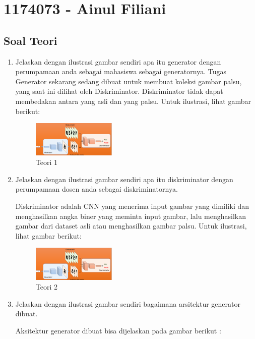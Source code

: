 \section{1174073 - Ainul Filiani}
\subsection{Soal Teori}
\begin{enumerate}

	\item Jelaskan dengan ilustrasi gambar sendiri apa itu generator dengan perumpamaan anda sebagai mahasiswa sebagai generatornya.
	\hfill\break
	Tugas Generator sekarang sedang dibuat untuk membuat koleksi gambar palsu, yang saat ini dilihat oleh Diskriminator. Diskriminator tidak dapat membedakan antara yang asli dan yang palsu. Untuk ilustrasi, lihat gambar berikut: 

	\begin{figure}[H]
	\centering
		\includegraphics[width=4cm]{figures/1174073/tugas8/materi/teori1,2.PNG}
		\caption{Teori 1}
	\end{figure}

	\item Jelaskan dengan ilustrasi gambar sendiri apa itu diskriminator dengan perumpamaan dosen anda sebagai diskriminatornya.

	\hfill\break
	Diskriminator adalah CNN yang menerima input gambar yang dimiliki dan menghasilkan angka biner yang meminta input gambar, lalu menghasilkan gambar dari dataset asli atau menghasilkan gambar palsu. Untuk ilustrasi, lihat gambar berikut: 

	\begin{figure}[H]
	\centering
		\includegraphics[width=4cm]{figures/1174073/tugas8/materi/teori1,2.PNG}
		\caption{Teori 2}
	\end{figure}
	
	\item Jelaskan dengan ilustrasi gambar sendiri bagaimana arsitektur generator dibuat.

	\hfill\break
	Aksitektur generator dibuat bisa dijelaskan pada gambar berikut : 


\end{enumerate}
